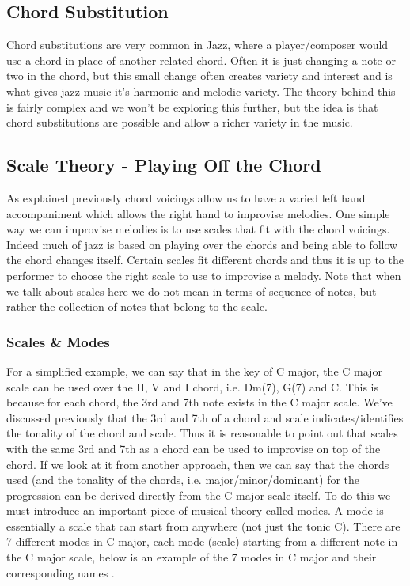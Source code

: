 \documentclass[pdftex,12pt,a4paper]{report}
\begin{document}
\subsection{Chord Substitution}
Chord substitutions are very common in Jazz, where a player/composer would use a chord in place of another related chord. Often it is just changing a note or two in the chord, but this small change often creates variety and interest and is what gives jazz music it's harmonic and melodic variety. The theory behind this is fairly complex and we won't be exploring this further, but the idea is that chord substitutions are possible and allow a richer variety in the music.

\subsection{Scale Theory - Playing Off the Chord}
As explained previously chord voicings allow us to have a varied left hand accompaniment which allows the right hand to improvise melodies. One simple way we can improvise melodies is to use scales that fit with the chord voicings. Indeed much of jazz is based on playing over the chords and being able to follow the chord changes itself. Certain scales fit different chords and thus it is up to the performer to choose the right scale to use to improvise a melody. Note that when we talk about scales here we do not mean in terms of sequence of notes, but rather the collection of notes that belong to the scale.

\subsubsection{Scales \& Modes}
For a simplified example, we can say that in the key of C major, the C major scale can be used over the II, V and I chord, i.e. Dm(7), G(7) and C. This is because for each chord, the 3rd and 7th note exists in the C major scale. We've discussed previously that the 3rd and 7th of a chord and scale indicates/identifies the tonality of the chord and scale. Thus it is reasonable to point out that scales with the same 3rd and 7th as a chord can be used to improvise on top of the chord.
If we look at it from another approach, then we can say that the chords used (and the tonality of the chords, i.e. major/minor/dominant) for the progression can be derived directly from the C major scale itself. To do this we must introduce an important piece of musical theory called modes. A mode is essentially a scale that can start from anywhere (not just the tonic C). There are 7 different modes in C major, each mode (scale) starting from a different note in the C major scale, below is an example of the 7 modes in C major and their corresponding names  \cite{jazzmusicmakers}.
\end{document}
